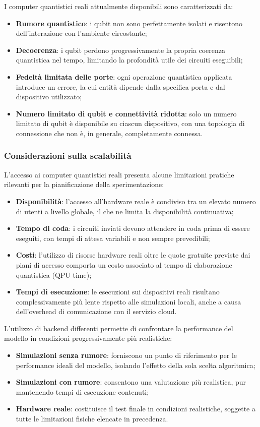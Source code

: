 I computer quantistici reali attualmente disponibili sono caratterizzati da:
\begin{itemize}
    \item \textbf{Rumore quantistico}: i qubit non sono perfettamente isolati e risentono dell'interazione con l'ambiente circostante;
    \item \textbf{Decoerenza}: i qubit perdono progressivamente la propria coerenza quantistica nel tempo, limitando la profondità utile dei circuiti eseguibili;
    \item \textbf{Fedeltà limitata delle porte}: ogni operazione quantistica applicata introduce un errore, la cui entità dipende dalla specifica porta e dal dispositivo utilizzato;
    \item \textbf{Numero limitato di qubit e connettività ridotta}: solo un numero limitato di qubit è disponibile su ciascun dispositivo, con una topologia di connessione che non è, in generale, completamente connessa.
\end{itemize}

\subsubsection{Considerazioni sulla scalabilità}
L'accesso ai computer quantistici reali presenta alcune limitazioni pratiche rilevanti per la pianificazione della sperimentazione:
\begin{itemize}
    \item \textbf{Disponibilità}: l'accesso all'hardware reale è condiviso tra un elevato numero di utenti a livello globale, il che ne limita la disponibilità continuativa;
    \item \textbf{Tempo di coda}: i circuiti inviati devono attendere in coda prima di essere eseguiti, con tempi di attesa variabili e non sempre prevedibili;
    \item \textbf{Costi}: l'utilizzo di risorse hardware reali oltre le quote gratuite previste dai piani di accesso comporta un costo associato al tempo di elaborazione quantistica (QPU time);
    \item \textbf{Tempi di esecuzione}: le esecuzioni sui dispositivi reali risultano complessivamente più lente rispetto alle simulazioni locali, anche a causa dell'overhead di comunicazione con il servizio cloud.
\end{itemize}

L'utilizzo di backend differenti permette di confrontare la performance del modello in condizioni progressivamente più realistiche:
\begin{itemize}
    \item \textbf{Simulazioni senza rumore}: forniscono un punto di riferimento per le performance ideali del modello, isolando l'effetto della sola scelta algoritmica;
    \item \textbf{Simulazioni con rumore}: consentono una valutazione più realistica, pur mantenendo tempi di esecuzione contenuti;
    \item \textbf{Hardware reale}: costituisce il test finale in condizioni realistiche, soggette a tutte le limitazioni fisiche elencate in precedenza.
\end{itemize}

